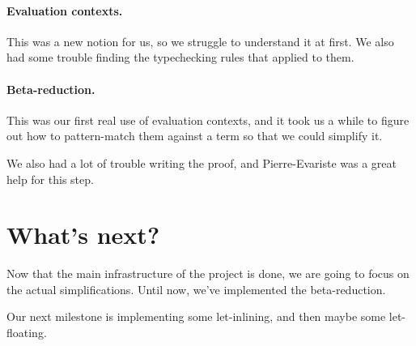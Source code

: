 \documentclass{article}
\begin{document}
\paragraph{Evaluation contexts.}This was a new notion for us, so we struggle to understand it at first.
We also had some trouble finding the typechecking rules that applied to them.

\paragraph{Beta-reduction.}This was our first real use of evaluation contexts, and it took us 
a while to figure out how to pattern-match them against a term so that we could simplify it.

We also had a lot of trouble writing the proof, and Pierre-Evariste was a great help for this step.

\section{What's next?}
Now that the main infrastructure of the project is done, we are going to focus on the actual simplifications.
Until now, we've implemented the beta-reduction.

Our next milestone is implementing some let-inlining, and then maybe some let-floating.
\end{document}
